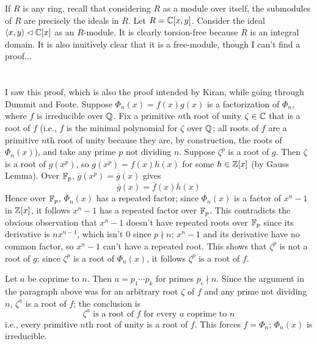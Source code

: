 \documentclass[12pt]{article}
\begin{document}
If $R$ is any ring, recall that considering $R$ as a module over itself, the submodules of $R$ are precisely the ideals in $R$. 
Let $R = \mathbb{C}[x, y]$. 
Consider the ideal $\langle x, y\rangle \lhd \mathbb{C}[x]$ as an $R$-module. 
It is clearly torsion-free because $R$ is an integral domain. 
It is also inuitively clear that it is a free-module, though I can't find a proof... 

\section{}
I saw this proof, which is also the proof intended by Kiran, while going through Dummit and Foote. 
Suppose $\Phi_{n}(x) = f(x)g(x)$ is a factorization of $\Phi_n$, where $f$ is irreducible over $\mathbb{Q}$. 
Fix a primitive $n$th root of unity $\zeta \in \mathbb{C}$ that is a root of $f$ (i.e., $f$ is the minimal polynomial for $\zeta$ over $\mathbb{Q}$; 
all roots of $f$ are a primitive $n$th root of unity because they are, by construction, the roots of $\Phi_n(x)$), and take any prime $p$ not dividing $n$. 
Suppose $\zeta^p$ is a root of $g$. 
Then $\zeta$ is a root of $g(x^p)$, so $g(x^p) = f(x) h(x)$ for some $h \in \mathbb{Z}[x]$ (by Gauss Lemma). 
Over $\mathbb{F}_p$, $\overline{g}(x^p) = \overline{g}(x)$ gives 
$$\overline{g}(x) = \overline{f}(x) \overline{h}(x)$$
Hence over $\mathbb{F}_p$, $\overline{\Phi}_n(x)$ has a repeated factor; 
since $\Phi_n(x)$ is a factor of $x^n - 1$ in $\mathbb{Z}[x]$, it follows $x^n - 1$ has a repeated factor over $\mathbb{F}_p$. 
This contradicts the obvious observation that $x^n - 1$ doesn't have repeated roots over $\mathbb{F}_p$ since its derivative is $nx^{n - 1}$, which isn't 0 since $p \nmid n$; 
$x^n - 1$ and its derivative have no common factor, so $x^n - 1$ can't have a repeated root. 
This shows that $\zeta^p$ is not a root of $g$; since $\zeta^p$ is a root of $\Phi_n(x)$, it follows $\zeta^p$ is a root of $f$. 

Let $a$ be coprime to $n$. 
Then $a = p_1 \cdots p_k$ for primes $p_i \nmid n$. 
Since the argument in the paragraph above was for an arbitrary root $\zeta$ of $f$ and any prime not dividing $n$, $\zeta^{a}$ is a root of $f$; 
the conclusion is 
$$\zeta^{a} \text{ is a root of } f \text{ for every } a \text{ coprime to } n$$
i.e., every primitive $n$th root of unity is a root of $f$. 
This forces $f = \Phi_n$; $\Phi_n(x)$ is irreducible. 
\end{document}
